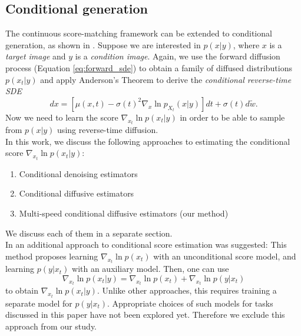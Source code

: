 \subsection{Conditional generation}
The continuous score-matching framework can be extended to conditional generation, as shown in  \cite{song2021sde}. Suppose we are interested in $p(x|y)$, where $x$ is a \textit{target image} and $y$ is a \textit{condition image}. Again, we use the forward diffusion process (Equation \ref{eq:forward_sde}) to obtain a family of diffused distributions $p(x_t | y)$ and apply Anderson's Theorem to derive the \textit{conditional reverse-time SDE}
\begin{equation}
    \label{eq:conditional_reverse_sde}
    dx = [\mu(x,t) - \sigma(t)^2 \nabla_{x} \ln p_{X_t}(x | y)]dt + \sigma(t)d\tilde{w}.
\end{equation}
Now we need to learn the score $\nabla_{x_t} \ln p(x_t|y)$ in order to be able to sample from $p(x | y)$ using reverse-time diffusion.\\

In this work, we discuss the following approaches to estimating the conditional score $\nabla_{x_t} \ln p(x_t|y)$:
\begin{enumerate}
    \item Conditional denoising estimators
    \item Conditional diffusive estimators
    \item Multi-speed conditional diffusive estimators (our method)
\end{enumerate}
We discuss each of them in a separate section.\\

In \cite{song2021sde} an additional approach to conditional score estimation was suggested:
This method proposes learning $\nabla_{x_t} \ln p(x_t)$ with an unconditional score model, and  learning $p(y | x_t)$ with an auxiliary model. Then, one can use 
    \begin{equation*}
        \nabla_{x_t}\ln p(x_t |y) = \nabla_{x_t} \ln p(x_t) + \nabla_{x_t} \ln p(y | x_t)
    \end{equation*}
to obtain $\nabla_{x_t} \ln p(x_t | y)$. Unlike other approaches, this requires training a separate model for $p(y|x_t)$. Appropriate choices of such models for tasks discussed in this paper have not been explored yet. Therefore we exclude this approach from our study. 

